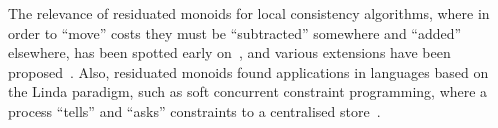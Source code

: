 \documentclass[a4paper]{elsarticle}
\newcommand{\1}{\mathbf{1}}
\begin{document}
The relevance of residuated monoids for local consistency algorithms, where in order to ``move'' costs they must be ``subtracted'' somewhere and ``added'' elsewhere,
 has been spotted early on~\cite{residuation1,resCS}, and various extensions  have been proposed~\cite{ipl}.
 Also, residuated monoids found applications in languages based on the Linda paradigm, such as 
soft concurrent constraint programming,  where a process  ``tells'' and ``asks'' constraints to a centralised store~\cite{labelled}. 
%
%
%
\end{document}
